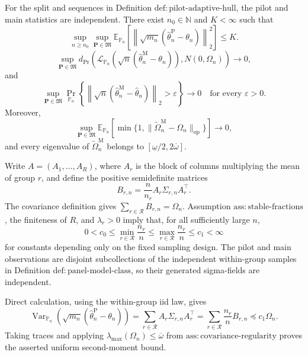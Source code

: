 For the split and sequences in Definition \(\mathrm{def:pilot\text{-}adaptive\text{-}hull}\), the pilot and main statistics are independent.  There exist \(n_0\in\mathbb N\) and \(K<\infty\) such that
\[
 \sup_{n\ge n_0}\sup_{\mathbf P\in\mathfrak M}
 \mathbb E_{\mathbb P_n}\!\left[
 \left\|\sqrt{m_n}(\widehat\theta_n^{\mathrm P}-\theta_n)\right\|_2^2
 \right]\le K.
\]
\[
 \sup_{\mathbf P\in\mathfrak M}
 d_{\mathrm{Pr}}\!\left(
 \mathcal L_{\mathbb P_n}(\sqrt n(\widehat\theta_n^{\mathrm M}-\theta_n)),
 N(0,\Omega_n)
 \right)\longrightarrow0,
\]
and
\[
 \sup_{\mathbf P\in\mathfrak M}
 \Pr_{\mathbb P_n}\!\left\{
 \left\|\sqrt n(\widehat\theta_n^{\mathrm M}-\widehat\theta_n)\right\|_2>\varepsilon
 \right\}\longrightarrow0
 \quad\text{for every }\varepsilon>0.
\]
Moreover,
\[
 \sup_{\mathbf P\in\mathfrak M}
 \mathbb E_{\mathbb P_n}\!\left[
 \min\{1,\|\widetilde\Omega_n^{\mathrm M}-\Omega_n\|_{\mathrm{op}}\}
 \right]\longrightarrow0,
\]
and every eigenvalue of \(\widetilde\Omega_n^{\mathrm M}\) belongs to \([\underline\omega/2,2\overline\omega]\).

Write \(A=(A_1,\ldots,A_R)\), where \(A_r\) is the block of columns multiplying the mean of group \(r\), and define the positive semidefinite matrices
\[
 B_{r,n}=\frac n{n_r}A_r\Sigma_{r,n}A_r^{\top}.
\]
The covariance definition gives \(\sum_{r\in\mathcal R}B_{r,n}=\Omega_n\).  Assumption \(\mathrm{ass:stable\text{-}fractions}\), the finiteness of \(R\), and \(\lambda_r>0\) imply that, for all sufficiently large \(n\),
\[
 0<c_0\le \min_{r\in\mathcal R}\frac{n_r}{n}
 \le \max_{r\in\mathcal R}\frac{n_r}{n}\le c_1<\infty
\tag{17}
\]
for constants depending only on the fixed sampling design.  The pilot and main observations are disjoint subcollections of the independent within-group samples in Definition \(\mathrm{def:panel\text{-}model\text{-}class}\), so their generated sigma-fields are independent.

Direct calculation, using the within-group iid law, gives
\[
 \operatorname{Var}_{\mathbb P_n}\!\left(
 \sqrt{m_n}(\widehat\theta_n^{\mathrm P}-\theta_n)
 \right)
 =\sum_{r\in\mathcal R}A_r\Sigma_{r,n}A_r^{\top}
 =\sum_{r\in\mathcal R}\frac{n_r}{n}B_{r,n}
 \preceq c_1\Omega_n.
\]
Taking traces and applying \(\lambda_{\max}(\Omega_n)\le\overline\omega\) from \(\mathrm{ass:covariance\text{-}regularity}\) proves the asserted uniform second-moment bound.


